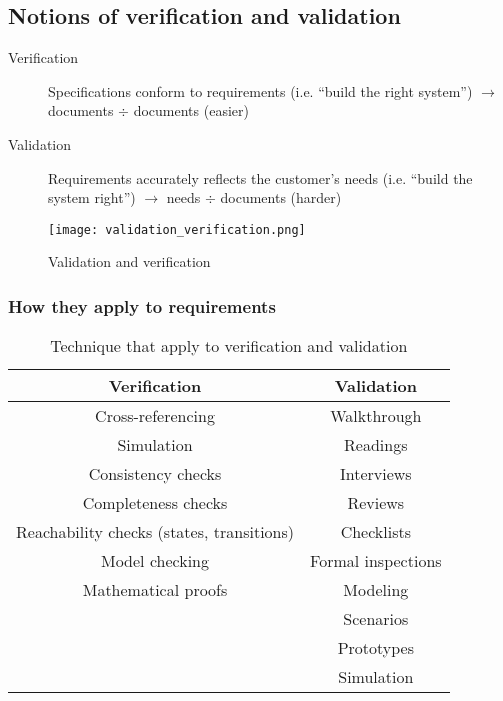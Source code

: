 \subsection{Notions of verification and validation}

\begin{description}
    \item[Verification] Specifications conform to requirements (i.e. \enquote{build the right system})
        \subitem{} $\rightarrow$ documents $\div$ documents
        (\textcolor{green!80!black}{easier})
    \item[Validation] Requirements accurately reflects the customer's needs (i.e. \enquote{build the system right})
        \subitem{} $\rightarrow$ needs $\div$ documents (\textcolor{red!80!black}{harder})
\end{description}

\begin{figure}[!ht]
    \centering
    \texttt{[image: validation\_verification.png]}
    \caption{Validation and verification}
\end{figure}
\FloatBarrier{}

\subsubsection{How they apply to requirements}

\begin{table}[!ht]
    \begin{center}
        \begin{tabular}{cc}
            \toprule
            Verification            & Validation \\
            \midrule
            Cross-referencing       & Walkthrough \\
            Simulation              & Readings \\
            Consistency checks      & Interviews \\
            Completeness checks     & Reviews \\
            Reachability checks (states, transitions) & Checklists \\
            Model checking          & Formal inspections \\
            Mathematical proofs     & Modeling \\
                                    & Scenarios \\
                                    & Prototypes \\
                                    & Simulation \\
            \bottomrule
        \end{tabular}
    \end{center}
    \caption{Technique that apply to verification and validation}
\end{table}

